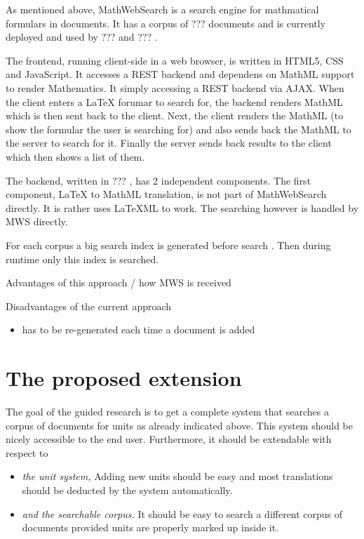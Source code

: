 \documentclass[11pt]{article}
\begin{document}
As mentioned above, MathWebSearch is a search engine for mathmatical formulars in documents. It has a corpus of ???  documents and is currently deployed and used by ??? and ??? .

The frontend, running client-side in a web browser, is written in HTML5, CSS and JavaScript. It accesses a REST backend and dependens on MathML support to render Mathematics. It simply accessing a REST backend via AJAX. When the client enters a LaTeX forumar to search for, the backend renders MathML which is then sent back to the client. Next, the client renders the MathML (to show the formular the user is searching for) and also sends back the MathML to the server to search for it. Finally the server sends back results to the client which then shows a list of them.

The backend, written in ??? , has 2 independent components. The first component, LaTeX to MathML translation, is not part of MathWebSearch directly. It is rather uses LaTeXML to work. The searching however is handled by MWS directly.

For each corpus a big search index is generated before search . Then during runtime only this index is searched. 


Advantages of this approach / how MWS is received

Disadvantages of the current approach
\begin{itemize}
  \item has to be re-generated each time a document is added
\end{itemize}

\section{The proposed extension}
\label{sec:extension}

The goal of the guided research is to get a complete system that searches a corpus of documents for units as already indicated above. This system should be nicely accessible to the end user. Furthermore, it should be extendable with respect to
\begin{itemize}
  \item \textit{the unit system, } Adding new units should be easy and most translations should be deducted by the system automatically.
  \item \textit{and the searchable corpus. } It should be easy to search a different corpus of documents provided units are properly marked up inside it.
\end{itemize}
\end{document}
